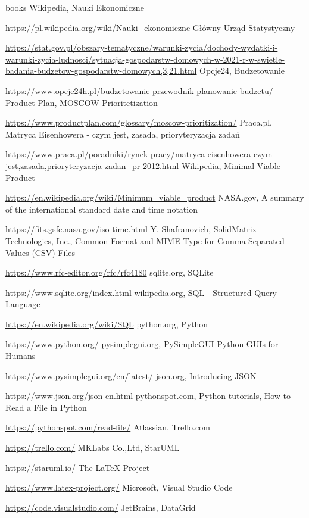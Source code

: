 \documentclass[a4paper,10pt, twoside]{report}
\begin{document}
\begin{thebibliography} {books}
 Wikipedia, Nauki Ekonomiczne \raggedright\url{
    https://pl.wikipedia.org/wiki/Nauki_ekonomiczne}
 Główny Urząd Statystyczny \raggedright\url{
    https://stat.gov.pl/obszary-tematyczne/warunki-zycia/dochody-wydatki-i-warunki-zycia-ludnosci/sytuacja-gospodarstw-domowych-w-2021-r-w-swietle-badania-budzetow-gospodarstw-domowych,3,21.html}
 Opcje24, Budzetowanie \raggedright\url{
    https://www.opcje24h.pl/budzetowanie-przewodnik-planowanie-budzetu/}
 Product Plan, MOSCOW Prioritetization \raggedright\url{
    https://www.productplan.com/glossary/moscow-prioritization/}
Praca.pl, Matryca Eisenhowera - czym jest, zasada, prioryteryzacja zadań \raggedright\url{
    https://www.praca.pl/poradniki/rynek-pracy/matryca-eisenhowera-czym-jest,zasada,prioryteryzacja-zadan_pr-2012.html}
 Wikipedia, Minimal Viable Product \raggedright\url{
    https://en.wikipedia.org/wiki/Minimum_viable_product}
 NASA.gov, A summary of the international standard date and time notation \raggedright\url{
    https://fits.gsfc.nasa.gov/iso-time.html}
 Y. Shafranovich, SolidMatrix Technologies, Inc., Common Format and MIME Type for Comma-Separated Values (CSV) Files \raggedright\url{
    https://www.rfc-editor.org/rfc/rfc4180}
 sqlite.org, SQLite \raggedright\url{
    https://www.sqlite.org/index.html}
 wikipedia.org, SQL - Structured Query Language \raggedright\url{
    https://en.wikipedia.org/wiki/SQL}
 python.org, Python \raggedright\url{
    https://www.python.org/}
 pysimplegui.org, PySimpleGUI Python GUIs for Humans \raggedright\url{
    https://www.pysimplegui.org/en/latest/}
 json.org, Introducing JSON \raggedright\url{
    https://www.json.org/json-en.html}
 pythonspot.com, Python tutorials, How to Read a File in Python \raggedright\url{
    https://pythonspot.com/read-file/}
 Atlassian, Trello.com \raggedright\url{
    https://trello.com/}
 MKLabs Co.,Ltd, StarUML \raggedright\url{
    https://staruml.io/}
 The LaTeX Project \raggedright\url{
    https://www.latex-project.org/}
 Microsoft, Visual Studio Code \raggedright\url{
    https://code.visualstudio.com/}
 JetBrains, DataGrid \raggedright\url{
}
\end{thebibliography}
\end{document}
